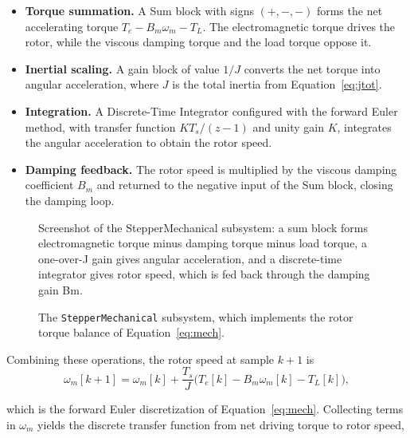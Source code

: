 \begin{itemize}
	\item \textbf{Torque summation.} A Sum block with signs $(+,-,-)$ forms the net accelerating torque $T_e - B_m \omega_m - T_L$. The electromagnetic torque drives the rotor, while the viscous damping torque and the load torque oppose it.
	
	\item \textbf{Inertial scaling.} A gain block of value $1/J$ 
	converts the net torque into angular acceleration, where $J$ is the total inertia from Equation~\eqref{eq:jtot}.
	
	\item \textbf{Integration.} A Discrete-Time Integrator configured with the forward Euler method, with transfer function $K T_s/(z-1)$ and unity gain $K$, integrates the angular acceleration to obtain the rotor speed.
	
	\item \textbf{Damping feedback.} The rotor speed is multiplied by the viscous damping coefficient $B_m$ and returned to the negative input of the Sum block, closing the damping loop.
\end{itemize}

\begin{figure}[htbp]
	\centering
		{Screenshot of the StepperMechanical subsystem: a sum block forms electromagnetic torque minus damping torque minus load torque, a one-over-J gain gives angular acceleration, and a discrete-time integrator gives rotor speed, which is fed back through the damping gain Bm.}
	\caption[The StepperMechanical subsystem]{The \texttt{StepperMechanical} subsystem, which implements the rotor torque balance of Equation~\eqref{eq:mech}.}
	\label{fig:stepper_mechanical}
\end{figure}


Combining these operations, the rotor speed at sample $k+1$ is
\begin{equation}
	\omega_m[k+1] = \omega_m[k]
	+ \frac{T_s}{J}\Big( T_e[k] - B_m \omega_m[k] - T_L[k] \Big),
	\label{eq:speed_update}
\end{equation}

which is the forward Euler discretization of Equation~\eqref{eq:mech}. Collecting terms in $\omega_m$ yields the discrete transfer function from net driving torque to rotor speed,

